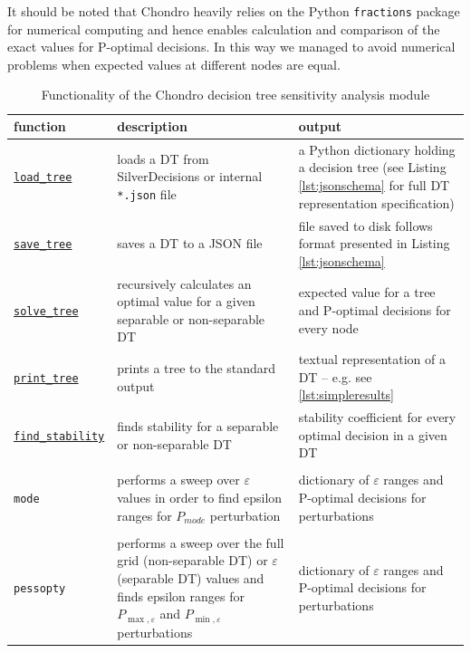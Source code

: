 \documentclass[a4paper,10pt,english]{sphinxmanual}
\begin{document}
	It should be noted that Chondro heavily relies on the Python \texttt{fractions} package for numerical computing and hence enables calculation and comparison of the exact values for P-optimal decisions. In this way we managed to avoid numerical problems when expected values at different nodes are equal.	
	
	\begin{table}
		\begin{tabularx}{\textwidth}{|l|X|X|}
			\hline 
			\textbf{function} & \textbf{description} & \textbf{output}\\ \hline
			\hyperref[index:chondro.load_tree]{\texttt{load\_tree}} & loads a DT from  SilverDecisions or internal \texttt{*.json} file & a Python dictionary holding a decision tree (see Listing \ref{lst:jsonschema} for full DT representation specification)\\ \hline
			\hyperref[index:chondro.save_tree]{\texttt{save\_tree}} & saves a DT to a JSON file & file saved to disk follows format presented in Listing \ref{lst:jsonschema} \\ \hline
			\hyperref[index:chondro.solve_tree]{\texttt{solve\_tree}} & recursively calculates an optimal value for a given separable or non-separable DT & expected value for a tree and P-optimal decisions for every node \\ \hline
			\hyperref[index:chondro.print_tree]{\texttt{print\_tree}} & prints a tree to the standard output & textual representation of a DT -- e.g. see \ref{lst:simpleresults} \\ \hline			
			\hyperref[index:chondro.find_stability]{\texttt{find\_stability}} & finds stability for a separable or non-separable DT & stability coefficient for every optimal decision in a given DT 
			\\ \hline
			\hyperref[index:chondro.find_perturbation_mode]{\pbox{5cm}{
					\texttt{find\_}\texttt{perturbation\_}\\ \texttt{mode}}} & performs a sweep over $\varepsilon$ values in order to find epsilon ranges for $P_{mode}$ perturbation & dictionary of $\varepsilon$ ranges and P-optimal decisions for perturbations
			\\ \hline
			\hyperref[index:chondro.find_perturbation_pessopty]{\pbox{5cm}{
					\texttt{find\_}\texttt{perturbation\_}\\ \texttt{pessopty}}} & performs a sweep over the full grid (non-separable DT) or $\varepsilon$ (separable DT) values and finds epsilon ranges for $P_{\max,\varepsilon}$ and $P_{\min,\varepsilon}$ perturbations & dictionary of $\varepsilon$ ranges and P-optimal decisions for perturbations
			\\ \hline			
		\end{tabularx} 
		\caption{Functionality of the Chondro decision tree sensitivity analysis module}\label{tab:chondro}
	\end{table}	
	
\end{document}
